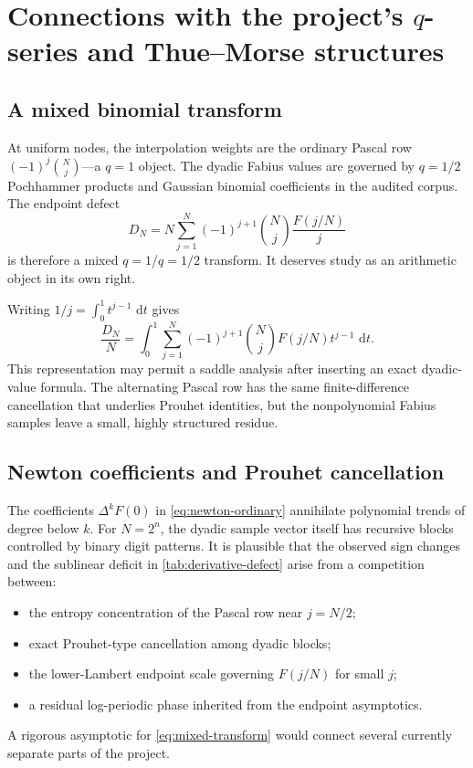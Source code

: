 \documentclass[11pt,oneside]{article}
\numberwithin{equation}{section}
\theoremstyle{definition}
\theoremstyle{remark}
\newcommand{\dd}{\,\mathrm d}
\begin{document}
\section{Connections with the project's $q$-series and Thue--Morse structures}
\label{sec:q-connections}

\subsection{A mixed binomial transform}

At uniform nodes, the interpolation weights are the ordinary Pascal row
$(-1)^j\binom Nj$---a $q=1$ object.  The dyadic Fabius values are governed by
$q=1/2$ Pochhammer products and Gaussian binomial coefficients in the audited corpus.
The endpoint defect
\begin{equation}
 D_N=N\sum_{j=1}^{N}(-1)^{j+1}\binom Nj\frac{F(j/N)}j
 \label{eq:mixed-transform}
\end{equation}
is therefore a mixed $q=1$/$q=1/2$ transform.  It deserves study as an arithmetic object
in its own right.

Writing $1/j=\int_0^1t^{j-1}\,\dd t$ gives
\begin{equation}
 \frac{D_N}{N}
 =\int_0^1\sum_{j=1}^{N}(-1)^{j+1}\binom NjF(j/N)t^{j-1}\,\dd t.
 \label{eq:derivative-integral}
\end{equation}
This representation may permit a saddle analysis after inserting an exact dyadic-value
formula.  The alternating Pascal row has the same finite-difference cancellation that
underlies Prouhet identities, but the nonpolynomial Fabius samples leave a small, highly
structured residue.

\subsection{Newton coefficients and Prouhet cancellation}

The coefficients $\Delta^kF(0)$ in \eqref{eq:newton-ordinary} annihilate polynomial trends
of degree below $k$.  For $N=2^n$, the dyadic sample vector itself has recursive blocks
controlled by binary digit patterns.  It is plausible that the observed sign changes and
the sublinear deficit in \cref{tab:derivative-defect} arise from a competition between:
\begin{itemize}
\item the entropy concentration of the Pascal row near $j=N/2$;
\item exact Prouhet-type cancellation among dyadic blocks;
\item the lower-Lambert endpoint scale governing $F(j/N)$ for small $j$;
\item a residual log-periodic phase inherited from the endpoint asymptotics.
\end{itemize}
A rigorous asymptotic for \eqref{eq:mixed-transform} would connect several currently
separate parts of the project.
\end{document}
